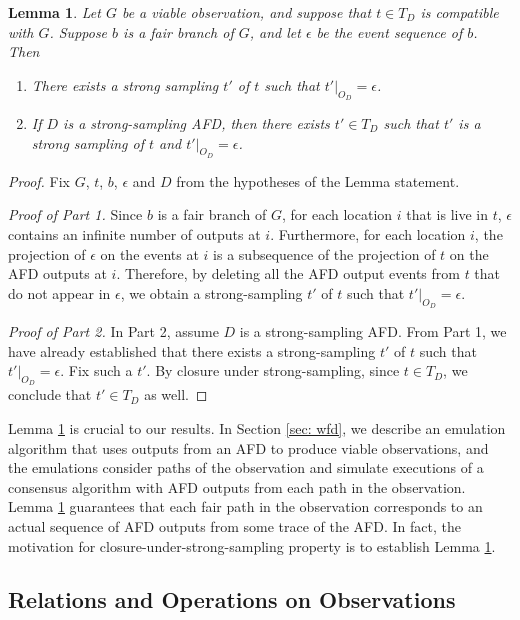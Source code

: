 \documentclass[11pt]{article}
\numberwithin{theorem}{section}
\newtheorem{lemma}[theorem]{Lemma}
\newcommand{\FD}{D}
\begin{document}
\begin{lemma}
\label{prop:sampledSubsequence}
\label{prop:pathIsTrace}
Let $G$ be a viable observation, and suppose that $t \in T_D$ is
compatible with $G$. 
Suppose $b$ is a fair branch of $G$, and let $\epsilon$ be the event
sequence of $b$. 
Then
\begin{enumerate}
\item
There exists a strong sampling $t'$ of $t$ such that
$t'|_{O_D} = \epsilon$. 
\item
If $\FD$ is a strong-sampling AFD, then there exists $t' \in T_D$ 
such that $t'$ is a strong sampling of $t$ and $t'|_{O_D} = \epsilon$.
\end{enumerate}
\end{lemma}
\begin{proof}
Fix $G$, $t$, $b$, $\epsilon$ and $D$ from the hypotheses of the Lemma statement.
 
\emph{Proof of Part 1.}
Since $b$ is a fair branch of $G$, for each location $i$ that is live in $t$, $\epsilon$ contains an infinite number of outputs at $i$. Furthermore, for each location $i$, the projection of $\epsilon$ on the events at $i$ is a subsequence of the projection of $t$ on the AFD outputs at $i$. Therefore, by deleting all the AFD output events from $t$ that do not appear in $\epsilon$, we obtain a strong-sampling $t'$ of $t$ such that $t'|_{O_D} = \epsilon$.

\emph{Proof of Part 2.}
In Part 2, assume $\FD$ is a strong-sampling AFD. From Part 1, we have already established that there exists a strong-sampling $t'$ of $t$ such that $t'|_{O_D} = \epsilon$. Fix such a $t'$. By closure under strong-sampling, since $t \in T_D$, we conclude that $t' \in T_D$ as well.
\end{proof}


Lemma \ref{prop:sampledSubsequence} is crucial to our results. In Section \ref{sec: wfd}, we describe an emulation algorithm that uses outputs from an AFD to produce viable observations, and the emulations consider paths of the observation and simulate executions of a consensus algorithm with AFD outputs from each path in the observation. Lemma \ref{prop:sampledSubsequence} guarantees that each fair path in the observation corresponds to an actual sequence of AFD outputs from some trace of the AFD. In fact, the motivation for closure-under-strong-sampling property is to establish Lemma \ref{prop:sampledSubsequence}. 

\subsection{Relations and Operations on Observations}\label{subsec:OperationsOnObservations}
\end{document}
